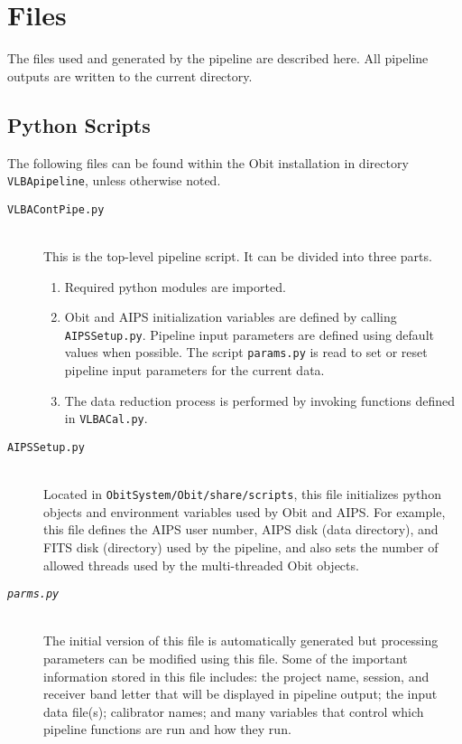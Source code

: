\documentclass[10pt,onecolumn,final]{IEEEtran}
\begin{document}
\section{Files} \label{files}

The files used and generated by the pipeline are described here.  All
pipeline outputs are written to the current directory. 

\subsection{Python Scripts}

The following files can be found within the Obit installation in
directory {\tt VLBApipeline}, unless otherwise noted. 

\begin{description}
\item[\tt VLBAContPipe.py] \hfill \\ This is the top-level pipeline script. It can be divided into three parts.
	\begin{enumerate}
		\item Required python modules are imported.  
		\item Obit and AIPS initialization variables are defined by calling {\tt AIPSSetup.py}.  Pipeline input parameters are defined using default values when possible.  The script {\tt params.py} is read to set or reset pipeline input parameters for the current data.  
		\item The data reduction process is performed by invoking functions defined in {\tt VLBACal.py}.
	\end{enumerate}

\item[\tt AIPSSetup.py] \hfill \\ Located in \verb|ObitSystem/Obit/share/scripts|, this file initializes python objects and environment variables used by Obit and AIPS.  For example, this file defines the AIPS user number, AIPS disk (data directory), and FITS disk (directory) used by the pipeline, and also sets the number of allowed threads used by the multi-threaded Obit objects.

\item[\tt \emph{parms.py}] \hfill \\ 
The initial version of this file is automatically generated but
processing parameters can be modified using this file.
Some of the important information stored in this file includes:
the project name, session, and receiver band letter that will be
displayed in pipeline output; the input data file(s); calibrator
names; and many variables that control which pipeline functions are
run and how they run.     


\end{description}
\end{document}
